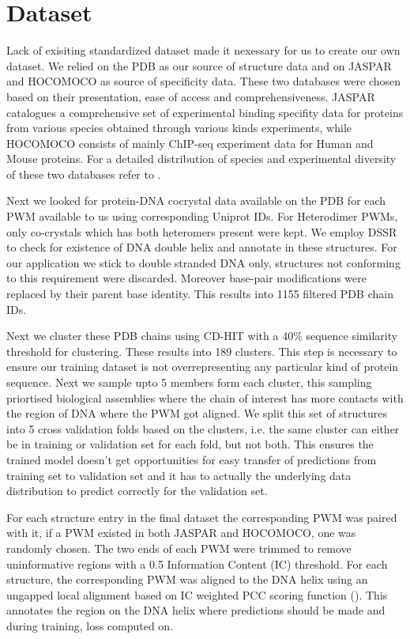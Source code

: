 \section{Dataset}
Lack of exisiting standardized dataset made it nexessary for us to create our own dataset. We relied
on the PDB as our source of structure data and on JASPAR and HOCOMOCO as source
of specificity data. These two databases were chosen based on their presentation, ease of access and
comprehensiveness. JASPAR \citep{fornes2020jaspar} catalogues a comprehensive set of experimental
binding specifity data for proteins from various species obtained through various kinds experiments,
while HOCOMOCO \citep{kulakovskiy2018hocomoco} consists of mainly ChIP-seq experiment data for Human
and Mouse proteins. For a detailed distribution of species and experimental diversity of these two
databases refer to . 
\par
Next we looked for protein-DNA cocrystal data available on the PDB for each PWM available to us
using corresponding Uniprot IDs. For Heterodimer PWMs, only co-crystals which has both heteromers
present were kept. We employ DSSR \citep{lu2015dssr} to check for existence of DNA
double helix and annotate in these structures. For our application we stick to double stranded DNA
only, structures not conforming to this requirement were discarded. Moreover base-pair modifications
were replaced by their parent base identity. This results into 1155 filtered PDB chain IDs.
\par
Next we cluster these PDB chains using CD-HIT \citep{fu2012cd} with a 40\% sequence similarity
threshold for clustering. These results into 189 clusters. This step is necessary to ensure our
training dataset is not overrepresenting any particular kind of protein sequence. Next we sample
upto 5 members form each cluster, this sampling priortised
biological assemblies where the chain of interest has more contacts with the region of DNA where the
PWM got aligned. We split this set of structures  into 5 cross validation folds based on the clusters,  
i.e. the same cluster can either be in training or validation set for each fold, but not both. This
ensures the trained model doesn't get opportunities for easy transfer of predictions from training
set to validation set and it has to actually the underlying data distribution to predict correctly
for the validation set.
\par
For each structure entry in the final dataset the corresponding PWM was paired with it, if a PWM
existed in both JASPAR and HOCOMOCO, one was randomly chosen. The two ends of each PWM were trimmed to
remove uninformative regions with a 0.5 Information Content (IC) threshold. For each structure, the
corresponding PWM was aligned to the DNA helix using an ungapped local alignment based on IC
weighted PCC scoring function (). This annotates the region on the DNA helix
where predictions should be made and during training, loss computed on.
